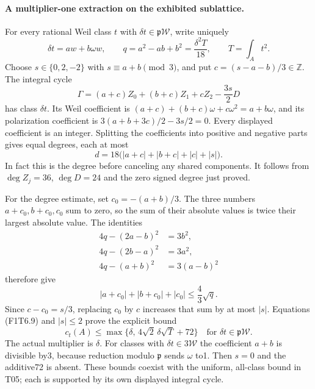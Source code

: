 \paragraph{A multiplier-one extraction on the exhibited sublattice.}
For every rational Weil class $t$ with $\delta t\in\mathfrak p\mathscr W$,
write uniquely
\[
 \delta t=aw+b\omega w,
 \qquad q=a^2-ab+b^2=\frac{\delta^2T}{18},
 \qquad T=\int_A t^2.
 \tag{F1T6.7}
\]
Choose $s\in\{0,2,-2\}$ with $s\equiv a+b\pmod3$, and put
$c=(s-a-b)/3\in\mathbb Z$. The integral cycle
\[
 \Gamma=(a+c)Z_0+(b+c)Z_1+cZ_2-\frac{3s}{2}D
 \tag{F1T6.8}
\]
has class $\delta t$. Its Weil coefficient is
$(a+c)+(b+c)\omega+c\omega^2=a+b\omega$,
and its polarization coefficient is
$3(a+b+3c)/2-3s/2=0$. Every displayed coefficient is an
integer. Splitting the coefficients into positive and negative
parts gives equal degrees, each at most
\[
 d=18\bigl(|a+c|+|b+c|+|c|+|s|\bigr).
 \tag{F1T6.9}
\]
In fact this is the degree before canceling any shared components.
It follows from $\deg Z_j=36$, $\deg D=24$ and the zero
signed degree just proved.

For the degree estimate, set $c_0=-(a+b)/3$. The three
numbers $a+c_0,b+c_0,c_0$ sum to zero, so the sum of their
absolute values is twice their largest absolute value.
The identities
\[
 \begin{split}
 4q-(2a-b)^2&=3b^2,\\
 4q-(2b-a)^2&=3a^2,\\
 4q-(a+b)^2&=3(a-b)^2
 \end{split}
\]
therefore give
\[
 |a+c_0|+|b+c_0|+|c_0|\le\frac43\sqrt q.
\]
Since $c-c_0=s/3$, replacing $c_0$ by $c$ increases that
sum by at most $|s|$. Equations (F1T6.9) and $|s|\le2$
prove the explicit bound
\[
 \boxed{c_t(A)\le
   \max\{\delta,\,4\sqrt2\,\delta\sqrt T+72\}}
 \quad\text{for }\delta t\in\mathfrak p\mathscr W.
 \tag{F1T6.10}
\]
The actual multiplier is $\delta$. For classes with
$\delta t\in3\mathscr W$ the coefficient $a+b$ is divisible
by3, because reduction modulo $\mathfrak p$ sends $\omega$ to1.
Then $s=0$ and the additive72 is absent. These bounds coexist
with the uniform, all-class bound in T05; each is supported
by its own displayed integral cycle.

